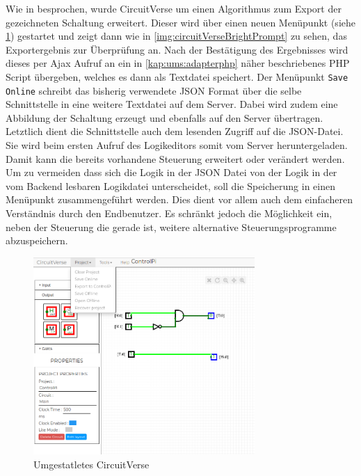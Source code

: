  Wie in  besprochen, wurde CircuitVerse um einen Algorithmus zum Export der gezeichneten Schaltung erweitert. Dieser wird über einen neuen Menüpunkt (siehe \ref{img:circuitVerseBright}) gestartet und zeigt dann wie in \autoref{img:circuitVerseBrightPrompt} zu sehen, das Exportergebnis zur Überprüfung an. Nach der Bestätigung des Ergebnisses wird dieses per Ajax Aufruf an ein in \autoref{kap:ums:adapterphp} näher beschriebenes PHP Script übergeben, welches es dann als Textdatei speichert. Der Menüpunkt \texttt{Save Online} schreibt das bisherig verwendete JSON Format über die selbe Schnittstelle in eine weitere Textdatei auf dem Server. Dabei wird zudem eine Abbildung der Schaltung erzeugt und ebenfalls auf den Server übertragen. Letztlich dient die Schnittstelle auch dem lesenden Zugriff auf die JSON-Datei. Sie wird beim ersten Aufruf des Logikeditors somit vom Server heruntergeladen. Damit kann die bereits vorhandene Steuerung erweitert oder verändert werden. Um zu vermeiden dass sich die Logik in der JSON Datei von der Logik in der vom Backend lesbaren Logikdatei unterscheidet, soll die Speicherung in einen Menüpunkt zusammengeführt werden. Dies dient vor allem auch dem einfacheren Verständnis durch den Endbenutzer. Es schränkt jedoch die Möglichkeit ein, neben der Steuerung die gerade  ist, weitere alternative Steuerungsprogramme abzuspeichern.

\begin{figure}[H]
	\begin{center}
		\includegraphics[width=0.75\textwidth ,clip]{./images/circuitverseLogicBright.png}
		\caption{Umgestatletes CircuitVerse}
		\label{img:circuitVerseBright}
	\end{center} 
\end{figure}

